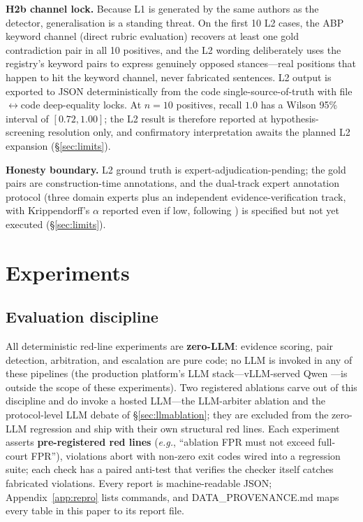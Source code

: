 \documentclass[11pt]{article}
\newcommand{\eg}{\emph{e.g.}}
\begin{document}
\textbf{H2b channel lock.} Because L1 is generated by the same authors as the
detector, generalisation is a standing threat. On the first 10 L2 cases,
the ABP keyword channel (direct rubric evaluation) recovers at least one gold
contradiction pair in all 10 positives, and the L2 wording deliberately uses
the registry's keyword pairs to express genuinely opposed stances—real
positions that happen to hit the keyword channel, never fabricated
sentences. L2 output is exported to JSON deterministically from the code
single-source-of-truth with file$\leftrightarrow$code deep-equality locks.
At $n=10$ positives, recall $1.0$ has a Wilson 95\% interval of
$[0.72, 1.00]$; the L2 result is therefore reported at
hypothesis-screening resolution only, and confirmatory interpretation
awaits the planned L2 expansion (\S\ref{sec:limits}).

\textbf{Honesty boundary.} L2 ground truth is expert-adjudication-pending;
the gold pairs are construction-time annotations, and the dual-track expert
annotation protocol (three domain experts plus an independent
evidence-verification track, with Krippendorff's $\alpha$ reported even if
low, following \citealp{cecil2026beyond}) is specified but not yet executed
(\S\ref{sec:limits}).

\section{Experiments}\label{sec:experiments}

\subsection{Evaluation discipline}\label{sec:discipline}

All deterministic red-line experiments are \textbf{zero-LLM}: evidence
scoring, pair detection, arbitration, and escalation are pure code; no LLM
is invoked in any of these pipelines (the production platform's LLM
stack—vLLM-served Qwen \citep{kwon2023vllm}—is outside the scope of these
experiments). Two registered ablations carve out of this discipline and do
invoke a hosted LLM—the LLM-arbiter ablation and the protocol-level LLM
debate of \S\ref{sec:llmablation}; they are excluded from the zero-LLM
regression and ship with their own structural red lines. Each experiment
asserts \textbf{pre-registered red lines} (\eg{}, ``ablation FPR
must not exceed full-court FPR''), violations abort with non-zero exit codes
wired into a regression suite; each check has a paired anti-test that
verifies the checker itself catches fabricated violations. Every report is
machine-readable JSON; Appendix~\ref{app:repro} lists commands, and
DATA\_PROVENANCE.md maps every table in this paper to its report file.
\end{document}
